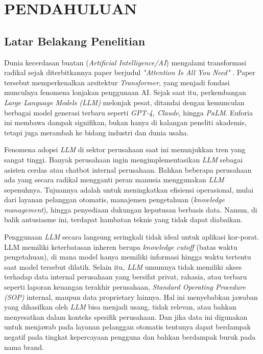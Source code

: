 \chapter{PENDAHULUAN}

\section{Latar Belakang Penelitian}
Dunia kecerdasan buatan (\textit{Artificial Intelligence/AI}) mengalami transformasi radikal sejak diterbitkannya paper berjudul \textit{"Attention Is All You Need"} \citep{vaswani2023attentionneed}. Paper tersebut memperkenalkan arsitektur \textit{Transformer}, yang menjadi fondasi munculnya fenomena lonjakan penggunaan AI. Sejak saat itu, perkembangan \textit{Large Language Models (LLM)} melonjak pesat, ditandai dengan kemunculan berbagai model generasi terbaru seperti \textit{GPT-4, Claude}, hingga \textit{PaLM}. Euforia ini membawa dampak signifikan, bukan hanya di kalangan peneliti akademis, tetapi juga merambah ke bidang industri dan dunia usaha.

Fenomena adopsi \textit{LLM} di sektor perusahaan saat ini menunjukkan tren yang sangat tinggi. Banyak perusahaan ingin mengimplementasikan \textit{LLM} sebagai asisten cerdas atau chatbot internal perusahaan. Bahkan beberapa perusahaan ada yang secara radikal mengganti peran manusia menggunakan \textit{LLM} sepenuhnya. Tujuannya adalah untuk meningkatkan efisiensi operasional, mulai dari layanan pelanggan otomatis, manajemen pengetahuan (\textit{knowledge management}), hingga penyediaan dukungan keputusan berbasis data. Namun, di balik antusiasme ini, terdapat hambatan teknis yang tidak dapat diabaikan.

Penggunaan \textit{LLM} secara langsung seringkali tidak ideal untuk aplikasi kor-porat. LLM memiliki keterbatasan inheren berupa \textit{knowledge cutoff} (batas waktu pengetahuan), di mana model hanya memiliki informasi hingga waktu tertentu saat model tersebut dilatih. Selain itu, \textit{LLM} umumnya tidak memiliki akses terhadap data internal perusahaan yang bersifat privat, rahasia, atau terbaru seperti laporan keuangan terakhir perusahaan, \textit{Standard Operating Procedure (SOP)} internal, maupun data proprietary lainnya. Hal ini menyebabkan jawaban yang dihasilkan oleh \textit{LLM} bisa menjadi usang, tidak relevan, atau bahkan menyesatkan dalam konteks spesifik perusahaan. Dan jika data ini digunakan untuk menjawab pada layanan pelanggan otomatis tentunya dapat berdampak negatif pada tingkat kepercayaan pengguna dan bahkan berdampak buruk pada nama brand.

